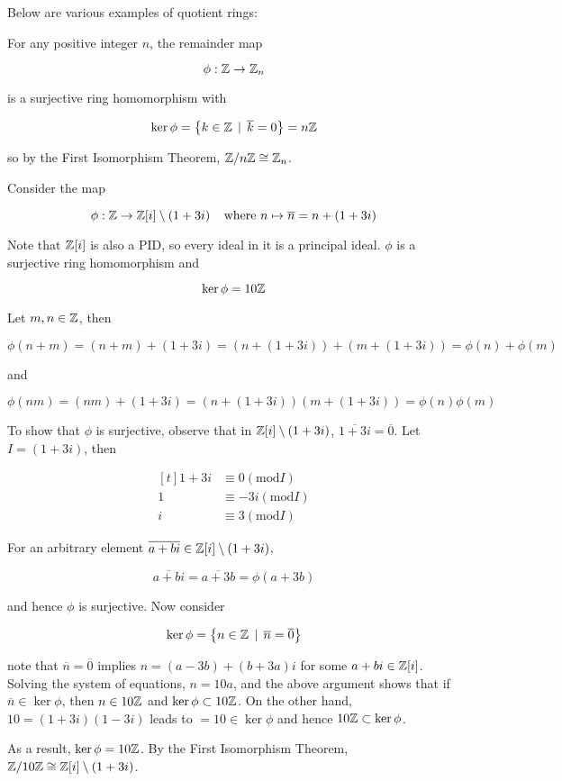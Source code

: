 \documentclass[a4paper,12pt]{article}
\begin{document}
\begin{exm}
  Below are various examples of quotient rings:

  \begin{alist}
    \item For any positive integer $n$, the remainder map

    $$\phi:\mathbb{Z}\to\mathbb{Z}_{n}$$\s

    is a surjective ring homomorphism with

    $$\ker\phi=\left\{ k\in\mathbb{Z}\,\mid\,\overline{k}=0\right\}=n\mathbb{Z}$$\s

    so by the First Isomorphism Theorem, $\mathbb{Z}/n\mathbb{Z}\cong\mathbb{Z}_{n}$.

    \item Consider the map

    $$\phi:\mathbb{Z}\to\mathbb{Z}[i]\setminus(1+3i)\;\;\;\;\text{where }n\mapsto\overline{n}=n+(1+3i)$$\s

    Note that $\mathbb{Z}[i]$ is also a PID, so every ideal in it is a principal ideal. $\phi$ is a surjective ring homomorphism and

    $$\ker\phi=10\mathbb{Z}$$\s

    \prf[zb] Let $m,n\in\mathbb{Z}$, then

    $$\phi(n+m)=(n+m)+(1+3i)=(n+(1+3i))+(m+(1+3i))=\phi(n)+\phi(m)$$\s

    and

    $$\phi(nm)=(nm)+(1+3i)=(n+(1+3i))(m+(1+3i))=\phi(n)\phi(m)$$\s

    To show that $\phi$ is surjective, observe that in $\mathbb{Z}[i]\setminus(1+3i)$, $\overline{1+3i}=\overline{0}$. Let $I=(1+3i)$, then

    $$\begin{aligned}[t]
      1+3i&\equiv 0(\mathrm{mod} I)\\
      1&\equiv-3i(\mathrm{mod} I)\\
      i&\equiv 3(\mathrm{mod} I)
    \end{aligned}$$\s

    For an arbitrary element $\overline{a+bi}\in\mathbb{Z}[i]\setminus(1+3i)$,

    $$\overline{a+bi}=\overline{a+3b}=\phi(a+3b)$$\s

    and hence $\phi$ is surjective. Now consider

    $$\ker\phi=\left\{ n\in\mathbb{Z}\,\mid\,\overline{n}=\overline{0}\right\}$$\s

    note that $\overline{n}=\overline{0}$ implies $n=(a-3b)+(b+3a)i$ for some $a+bi\in\mathbb{Z}[i]$. Solving the system of equations, $n=10a$, and the above argument shows that if $\overline{n}\in\ker\phi$, then $n\in 10\mathbb{Z}$ and $\ker\phi\subset 10\mathbb{Z}$. On the other hand, $10=(1+3i)(1-3i)$ leads to $=10\in\ker\phi$ and hence $10\mathbb{Z}\subset\ker\phi$.\n

    As a result, $\ker\phi=10\mathbb{Z}$. By the First Isomorphism Theorem, $\mathbb{Z}/10\mathbb{Z}\cong\mathbb{Z}[i]\setminus(1+3i)$.
  \end{alist}
\end{exm}
\end{document}
